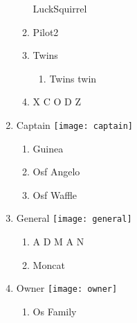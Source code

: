 \documentclass{article}
\begin{document}
\begin{enumerate}[I]
\begin{enumerate}[I]
	LuckSquirrel
      \item
	Pilot2
      \item
	Twins
	  \begin{enumerate}[I]
	    \item
	      Twins twin
	  \end{enumerate}
      \item
	X C O D Z
    \end{enumerate}
  \item
    Captain \texttt{[image: captain]}
    \begin{enumerate}[I]
      \item
	Guinea
      \item
	Osf Angelo
      \item
	Osf Waffle
    \end{enumerate}
  \item
    General \texttt{[image: general]}
    \begin{enumerate}[I]
      \item
	A D M A N
      \item
	Moncat
    \end{enumerate}
  \item
    Owner \texttt{[image: owner]}
    \begin{enumerate}[I]
      \item
	Os Family
    \end{enumerate}
\end{enumerate}
\end{document}
